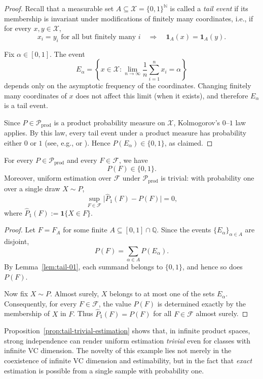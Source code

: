 \documentclass[arxiv]{colt2026}
\newcommand{\X}{\mathcal{X}}
\newcommand{\F}{\mathcal{F}}
\newcommand{\Pc}{\mathcal{P}}
\begin{document}
\begin{proof}
Recall that a measurable set $A\subseteq\X=\{0,1\}^{\mathbb N}$ is called a
\emph{tail event} if its membership is invariant under modifications of finitely
many coordinates, i.e., if for every $x,y\in\X$,
\[
x_i=y_i \text{ for all but finitely many } i
\quad\Longrightarrow\quad
\mathbf 1_A(x)=\mathbf 1_A(y).
\]

Fix $\alpha\in[0,1]$.
The event
\[
E_\alpha
=
\left\{
x\in\X :
\lim_{n\to\infty}\frac{1}{n}\sum_{i=1}^n x_i = \alpha
\right\}
\]
depends only on the asymptotic frequency of the coordinates.
Changing finitely many coordinates of $x$ does not affect this limit (when it
exists), and therefore $E_\alpha$ is a tail event.

Since $P\in\Pc_{\mathrm{prod}}$ is a product probability measure on $\X$,
Kolmogorov’s $0$--$1$ law applies.
By this law, every tail event under a product measure has probability either
$0$ or $1$ (see, e.g., \cite{shiryaev1996} or
\cite{durrett2019}).
Hence $P(E_\alpha)\in\{0,1\}$, as claimed.
\end{proof}

\begin{proposition}
\label{prop:tail-trivial-estimation}
For every $P\in\Pc_{\mathrm{prod}}$ and every $F\in\F$, we have
\[
P(F)\in\{0,1\}.
\]
Moreover, uniform estimation over $\F$ under $\Pc_{\mathrm{prod}}$ is trivial:
with probability one over a single draw $X\sim P$,
\[
\sup_{F\in\F}\bigl|\widehat P_1(F)-P(F)\bigr| = 0,
\]
where $\widehat P_1(F):=\mathbf 1\{X\in F\}$.
\end{proposition}

\begin{proof}
Let $F=F_A$ for some finite $A\subseteq[0,1]\cap\mathbb{Q}$.
Since the events $\{E_\alpha\}_{\alpha\in A}$ are disjoint,
\[
P(F) = \sum_{\alpha\in A} P(E_\alpha).
\]
By Lemma~\ref{lem:tail-01}, each summand belongs to $\{0,1\}$, and hence so does
$P(F)$.

Now fix $X\sim P$.
Almost surely, $X$ belongs to at most one of the sets $E_\alpha$.
Consequently, for every $F\in\F$, the value $P(F)$ is determined exactly by the
membership of $X$ in $F$.
Thus $\widehat P_1(F)=P(F)$ for all $F\in\F$ almost surely.
\end{proof}

\medskip

Proposition~\ref{prop:tail-trivial-estimation} shows that, in infinite product
spaces, strong independence can render uniform estimation \emph{trivial} even
for classes with infinite VC dimension.
The novelty of this example lies not merely in the coexistence of infinite VC
dimension and estimability, but in the fact that \emph{exact} estimation is
possible from a single sample with probability one.
\end{document}
